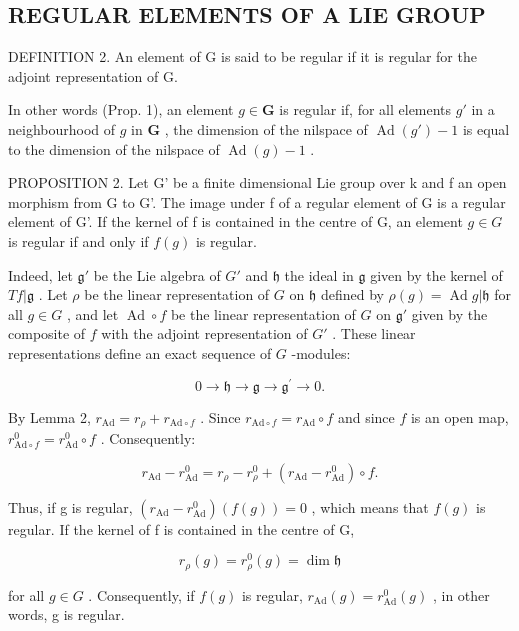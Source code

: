 \subsection{REGULAR ELEMENTS OF A LIE GROUP}

DEFINITION 2. An element of G is said to be regular if it is regular for the adjoint representation of G.

In other words (Prop. 1), an element \(g \in \mathbf{G}\) is regular if, for all elements \(g'\) in a neighbourhood of \(g\) in \(\mathbf{G}\) , the dimension of the nilspace of \(\operatorname{Ad}(g') - 1\) is equal to the dimension of the nilspace of \(\operatorname{Ad}(g) - 1\) .

PROPOSITION 2. Let G' be a finite dimensional Lie group over k and f an open morphism from G to G'. The image under f of a regular element of G is a regular element of G'. If the kernel of f is contained in the centre of G, an element \(g \in G\) is regular if and only if \(f(g)\) is regular.

Indeed, let \(\mathfrak{g}'\) be the Lie algebra of \(G'\) and \(\mathfrak{h}\) the ideal in \(\mathfrak{g}\) given by the kernel of \(Tf|\mathfrak{g}\) . Let \(\rho\) be the linear representation of \(G\) on \(\mathfrak{h}\) defined by \(\rho(g) = \operatorname{Ad} g|\mathfrak{h}\) for all \(g \in G\) , and let \(\operatorname{Ad} \circ f\) be the linear representation of \(G\) on \(\mathfrak{g}'\) given by the composite of \(f\) with the adjoint representation of \(G'\) . These linear representations define an exact sequence of \(G\) -modules:

\[
0 \to \mathfrak {h} \to \mathfrak {g} \to \mathfrak {g} ^ {\prime} \to 0.
\]

By Lemma 2, \(r_{\mathrm{Ad}} = r_{\rho} + r_{\mathrm{Ad}\circ f}\) . Since \(r_{\mathrm{Ad}\circ f} = r_{\mathrm{Ad}}\circ f\) and since \(f\) is an open map, \(r_{\mathrm{Ad}\circ f}^{0} = r_{\mathrm{Ad}}^{0}\circ f\) . Consequently:

\[
r _ {\mathrm{Ad}} - r _ {\mathrm{Ad}} ^ {0} = r _ {\rho} - r _ {\rho} ^ {0} + \left(r _ {\mathrm{Ad}} - r _ {\mathrm{Ad}} ^ {0}\right) \circ f.
\]

Thus, if g is regular, \((r_{\mathrm{Ad}} - r_{\mathrm{Ad}}^{0})(f(g)) = 0\) , which means that \(f(g)\) is regular. If the kernel of f is contained in the centre of G,

\[
r _ {\rho} (g) = r _ {\rho} ^ {0} (g) = \dim \mathfrak {h}
\]

for all \(g \in G\) . Consequently, if \(f(g)\) is regular, \(r_{\mathrm{Ad}}(g) = r_{\mathrm{Ad}}^{0}(g)\) , in other words, g is regular.

